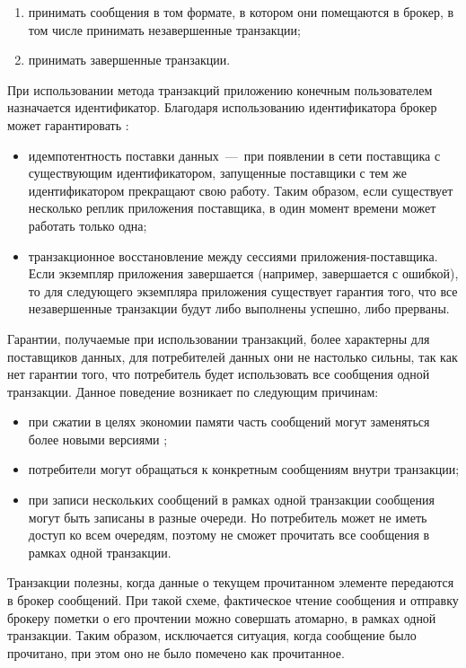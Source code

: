 \begin{enumerate}
	\item принимать сообщения в том формате, в котором они помещаются в брокер, в том числе принимать незавершенные транзакции;
	\item принимать завершенные транзакции. 
\end{enumerate}

При использовании метода транзакций приложению конечным пользователем назначается идентификатор.
Благодаря использованию идентификатора брокер может гарантировать \cite{bib:6}: 

\begin{itemize}
	\item идемпотентность поставки данных~---~при появлении в сети поставщика с существующим идентификатором, запущенные поставщики с тем же идентификатором прекращают свою работу. Таким образом, если существует несколько реплик приложения поставщика, в один момент времени может работать только одна;
	\item транзакционное восстановление между сессиями приложения-поставщика. Если экземпляр приложения завершается (например, завершается с ошибкой), то для следующего экземпляра приложения существует гарантия того, что все незавершенные транзакции будут либо выполнены успешно, либо прерваны.
\end{itemize}


Гарантии, получаемые при использовании транзакций, более характерны для поставщиков данных, для потребителей данных они не настолько сильны, так как нет гарантии того, что потребитель будет использовать все сообщения одной транзакции. Данное поведение возникает по следующим причинам:

\begin{itemize}
	\item при сжатии в целях экономии памяти часть сообщений могут заменяться более новыми версиями \cite{bib:6};
	\item потребители могут обращаться к конкретным сообщениям внутри транзакции;
	\item при записи нескольких сообщений в рамках одной транзакции сообщения могут быть записаны в разные очереди. Но потребитель может не иметь доступ ко всем очередям, поэтому не сможет прочитать все сообщения в рамках одной транзакции.
\end{itemize}

Транзакции полезны, когда данные о текущем прочитанном элементе передаются в брокер сообщений. При такой схеме, фактическое чтение сообщения и отправку брокеру пометки о его прочтении можно совершать атомарно, в рамках одной транзакции. Таким образом, исключается ситуация, когда сообщение было прочитано, при этом оно не было помечено как прочитанное.


